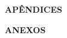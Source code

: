 
\begin{flushleft}
\textbf{APÊNDICES}
\end{flushleft}

\newpage


\begin{flushleft}
\textbf{ANEXOS}
\end{flushleft}

